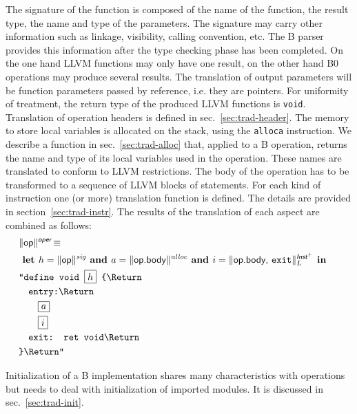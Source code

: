 \documentclass{llncs}
\newcommand{\trad}[2]{\ensuremath{\lVert \textsf{#1} \rVert^{\textit{#2}}}}
\newcommand{\nl}[0]{\text{\Return}}
\DeclareMathOperator{\isdef}{\equiv}
\newcommand{\llvm}[1]{\texttt{#1}}
\newcommand{\B}[1]{\textsf{#1}}
\newcommand{\ListOf}[1]{$\mbox{#1}^+$}
\newcommand{\LET}[0]{\textbf{ let }}
\newcommand{\IN}[0]{\textbf{ in }}
\newcommand{\AND}[0]{\textbf{ and }}
\newcommand{\PH}[1]{\framebox{$#1$}}
\begin{document}
The signature of the function is composed of the name of the function, the
result type, the name and type of the parameters. The signature may carry other
information such as linkage, visibility, calling convention, etc. The B parser
provides this information after the type checking phase has been completed.  On
the one hand LLVM functions may only have one result, on the other hand B0
operations may produce several results. The translation of output parameters
will be function parameters passed by reference, i.e. they are pointers. For
uniformity of treatment, the return type of the produced LLVM functions is
\llvm{void}. Translation of operation headers is defined in
sec.~\ref{sec:trad-header}. The memory to store local variables is allocated on
the stack, using the \llvm{alloca} instruction. We describe a function in
sec.~\ref{sec:trad-alloc} that, applied to a B operation, returns the name and
type of its local variables used in the operation. These names are translated to
conform to LLVM restrictions. The body of the operation has to be transformed to
a sequence of LLVM blocks of statements. For each kind of instruction one (or
more) translation function is defined. The details are provided in
section~\ref{sec:trad-instr}.  The results of the translation of each aspect are
combined as follows:
\begin{align*}
\begin{split}
  \lefteqn{\trad{\B{op}}{\B{oper}} \isdef} \\
  & \LET h = \trad{\B{op}}{sig} \AND   a = \trad{\B{op.body}}{alloc} \AND i = \trad{\B{op.body}, \llvm{exit}}{\ListOf{\B{Inst}}}_L \IN  \\
  & \llvm{"define void \PH{h} \{\nl} \\
  & \quad \llvm{entry:\nl} \\
  & \quad \quad \PH{a} \\
  & \quad \quad \PH{i} \\
  & \quad \llvm{exit: ret void\nl} \\
  & \llvm{\}\nl"}
\end{split}
\end{align*}

Initialization of a B implementation shares many characteristics with operations
but needs to deal with initialization of imported modules. It is discussed in
sec.~\ref{sec:trad-init}.
\end{document}
